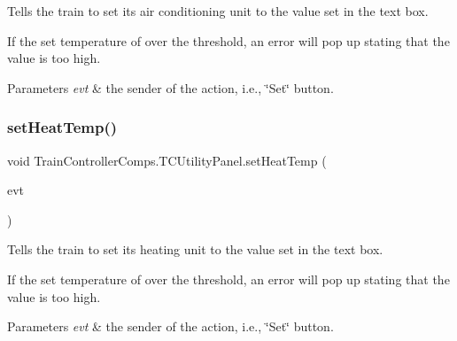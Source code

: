 Tells the train to set its air conditioning unit to the value set in the text box. 

If the set temperature of over the threshold, an error will pop up stating that the value is too high.


\begin{DoxyParams}{Parameters}
{\em evt} & the sender of the action, i.\+e., \char`\"{}\+Set\char`\"{} button. \\
\hline
\end{DoxyParams}
\mbox{\label{classTrainControllerComps_1_1TCUtilityPanel_a0123532c001a7bedfc7b4f54dbf26e5e}} 
\subsubsection{\texorpdfstring{set\+Heat\+Temp()}{setHeatTemp()}}
{\footnotesize\ttfamily void Train\+Controller\+Comps.\+T\+C\+Utility\+Panel.\+set\+Heat\+Temp (\begin{DoxyParamCaption}\item[{java.\+awt.\+event.\+Action\+Event}]{evt }\end{DoxyParamCaption})\hspace{0.3cm}{\ttfamily [private]}}



Tells the train to set its heating unit to the value set in the text box. 

If the set temperature of over the threshold, an error will pop up stating that the value is too high.


\begin{DoxyParams}{Parameters}
{\em evt} & the sender of the action, i.\+e., \char`\"{}\+Set\char`\"{} button. \\
\hline
\end{DoxyParams}
\mbox{\label{classTrainControllerComps_1_1TCUtilityPanel_a06c241551e5d282024843d8ae09bc6ba}} 
